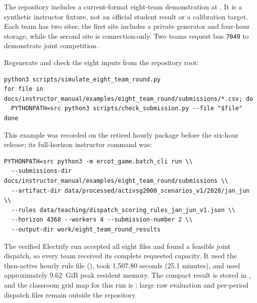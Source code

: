 \documentclass[12pt]{article}
\newcommand{\code}[1]{\texttt{#1}}
\begin{document}
The repository includes a current-format eight-team demonstration at
. It is a synthetic
instructor fixture, not an official student result or a calibration target.
Each team has two sites; the first site includes a private generator and
four-hour storage, while the second site is connection-only. Two teams request
bus \code{7049} to demonstrate joint competition.

Regenerate and check the eight inputs from the repository root:
\begin{lstlisting}
python3 scripts/simulate_eight_team_round.py
for file in docs/instructor_manual/examples/eight_team_round/submissions/*.csv; do
  PYTHONPATH=src python3 scripts/check_submission.py --file "$file"
done
\end{lstlisting}

This example was recorded on the retired hourly package before the six-hour
release; its full-horizon instructor command was:
\begin{lstlisting}
PYTHONPATH=src python3 -m ercot_game.batch_cli run \\
  --submissions-dir docs/instructor_manual/examples/eight_team_round/submissions \\
  --artifact-dir data/processed/activsg2000_scenarios_v1/2028/jan_jun \\
  --rules data/teaching/dispatch_scoring_rules_jan_jun_v1.json \\
  --horizon 4368 --workers 4 --submission-number 2 \\
  --output-dir work/eight_team_round_results
\end{lstlisting}

The verified Electrify run accepted all eight files and found a feasible joint
dispatch, so every team received its complete requested capacity. It used the
then-active hourly rule file (), took 1,507.80 seconds
(25.1 minutes), and used approximately 9.62~GiB peak resident memory.
The compact result is stored in
, and the
classroom grid map for this run is
; large raw
evaluation and per-period dispatch files remain outside the repository.
\end{document}
